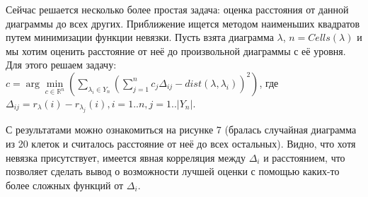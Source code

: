 \documentclass[12pt]{report}
\begin{document}
Сейчас решается несколько более простая задача: оценка расстояния от данной диаграммы до всех других. Приближение ищется методом наименьших квадратов путем минимизации функции невязки. Пусть взята диаграмма $\lambda$, $n = Cells(\lambda)$ и мы хотим оценить расстояние от неё до произвольной диаграммы с её уровня. Для этого решаем задачу: $c = \arg \min\limits_{c \in \mathbb{R}^n}(\sum\limits_{\lambda_i \in Y_n}(\sum\limits_{j = 1}^n c_j\Delta_{ij} - dist(\lambda, \lambda_i))^2)$, где $\Delta_{ij} = r_{\lambda}(i) - r_{\lambda_{j}}(i), i = 1..n, j = 1..|Y_n|$.

С результатами можно ознакомиться на рисунке 7 (бралась случайная диаграмма из 20 клеток и считалось расстояние от неё до всех остальных). Видно, что хотя невязка присутствует, имеется явная корреляция между $\Delta_i$ и расстоянием, что позволяет сделать вывод о возможности лучшей оценки с помощью каких-то более сложных функций от $\Delta_i$.
\end{document}
